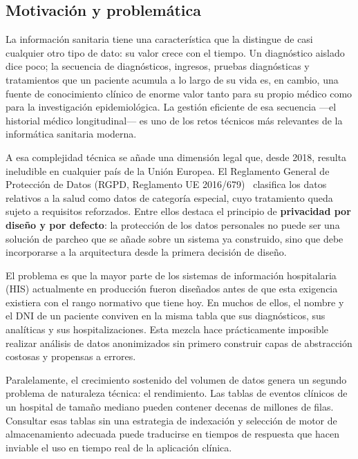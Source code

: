 \documentclass[../main.tex]{subfiles}
\begin{document}
\subsection{Motivación y problemática}

La información sanitaria tiene una característica que la distingue de casi cualquier otro tipo de dato: su valor crece con el tiempo. Un diagnóstico aislado dice poco; la secuencia de diagnósticos, ingresos, pruebas diagnósticas y tratamientos que un paciente acumula a lo largo de su vida es, en cambio, una fuente de conocimiento clínico de enorme valor tanto para su propio médico como para la investigación epidemiológica. La gestión eficiente de esa secuencia —el historial médico longitudinal— es uno de los retos técnicos más relevantes de la informática sanitaria moderna.

A esa complejidad técnica se añade una dimensión legal que, desde 2018, resulta ineludible en cualquier país de la Unión Europea. El Reglamento General de Protección de Datos (RGPD, Reglamento UE 2016/679)~\cite{rgpd2016} clasifica los datos relativos a la salud como datos de categoría especial, cuyo tratamiento queda sujeto a requisitos reforzados. Entre ellos destaca el principio de \textbf{privacidad por diseño y por defecto}: la protección de los datos personales no puede ser una solución de parcheo que se añade sobre un sistema ya construido, sino que debe incorporarse a la arquitectura desde la primera decisión de diseño.

El problema es que la mayor parte de los sistemas de información hospitalaria (HIS) actualmente en producción fueron diseñados antes de que esta exigencia existiera con el rango normativo que tiene hoy. En muchos de ellos, el nombre y el DNI de un paciente conviven en la misma tabla que sus diagnósticos, sus analíticas y sus hospitalizaciones. Esta mezcla hace prácticamente imposible realizar análisis de datos anonimizados sin primero construir capas de abstracción costosas y propensas a errores.

Paralelamente, el crecimiento sostenido del volumen de datos genera un segundo problema de naturaleza técnica: el rendimiento. Las tablas de eventos clínicos de un hospital de tamaño mediano pueden contener decenas de millones de filas. Consultar esas tablas sin una estrategia de indexación y selección de motor de almacenamiento adecuada puede traducirse en tiempos de respuesta que hacen inviable el uso en tiempo real de la aplicación clínica.
\end{document}
